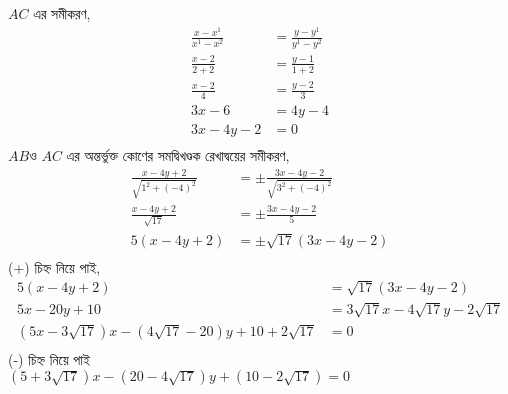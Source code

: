 \documentclass{article}
\begin{document}
$AC$ এর সমীকরণ,\\
\begin{align*}
	\frac{x-x^1}{x^1-x^2}&=\frac{y-y^1}{y^1-y^2}\\
	\frac{x-2}{2+2}&=\frac{y-1}{1+2}\\
	\frac{x-2}{4}&=\frac{y-2}{3}\\
	3x-6&=4y-4\\
	3x-4y-2&=0\\
\end{align*}
$AB$ও $AC$ এর অন্তর্ভুক্ত কোণের সমদ্বিখণ্ডক রেখাদ্বয়ের সমীকরণ,\\
	\begin{align*}
		\frac{x-4y+2}{\sqrt{1^2+(-4)^2}}&=\pm\frac{3x-4y-2}{\sqrt{3^2+(-4)^2}}\\
		\frac{x-4y+2}{\sqrt{17}}&=\pm\frac{3x-4y-2}{5}\\
		5(x-4y+2)&=\pm\sqrt{17}(3x-4y-2)\\
	\end{align*}
(+) চিহ্ন নিয়ে পাই,\\
\begin{align*}
	5(x-4y+2)&=\sqrt{17}(3x-4y-2)\\
	5x-20y+10&=3\sqrt{17}x-4\sqrt{17}y-2\sqrt{17}\\
	(5x-3\sqrt{17})x-(4\sqrt{17}-20)y+10+2\sqrt{17}&=0\\
\end{align*}
(-) চিহ্ন নিয়ে পাই\\
$(5+3\sqrt{17})x-(20-4\sqrt{17})y+(10-2\sqrt{17})=0$\\
\end{document}
